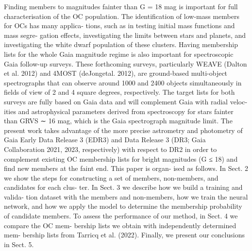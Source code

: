 \documentclass[../Main.tex]{subfiles}
\begin{document}
Finding members to magnitudes fainter than G = 18 mag is important for full characterisation of the OC population. The identification of low-mass members for OCs has many applica- tions, such as in testing initial mass functions and mass segre- gation effects, investigating the limits between stars and planets, and investigating the white dwarf population of these clusters. Having membership lists for the whole Gaia magnitude regime is also important for spectroscopic Gaia follow-up surveys. These forthcoming surveys, particularly WEAVE (Dalton et al. 2012) and 4MOST (deJongetal. 2012), are ground-based multi-object spectrographs that can observe around 1000 and 2400 objects simultaneously in fields of view of 2 and 4 square degrees, respectively. The target lists for both surveys are fully based on Gaia data and will complement Gaia with radial veloc- ities and astrophysical parameters derived from spectroscopy for stars fainter than GRVS ∼ 16 mag, which is the Gaia spectrograph magnitude limit.
The present work takes advantage of the more precise astrometry and photometry of Gaia Early Data Release 3 (EDR3) and Data Release 3 (DR3; Gaia Collaboration 2021, 2023, respectively) with respect to DR2 in order to complement existing OC membership lists for bright magnitudes (G ≤ 18) and find new members at the faint end. This paper is organ- ised as follows. In Sect. 2 we show the steps for constructing a set of members, non-members, and candidates for each clus- ter. In Sect. 3 we describe how we build a training and valida- tion dataset with the members and non-members, how we train the neural network, and how we apply the model to determine the membership probability of candidate members. To assess the performance of our method, in Sect. 4 we compare the OC mem- bership lists we obtain with independently determined mem- bership lists from Tarricq et al. (2022). Finally, we present our conclusions in Sect. 5.
\end{document}

